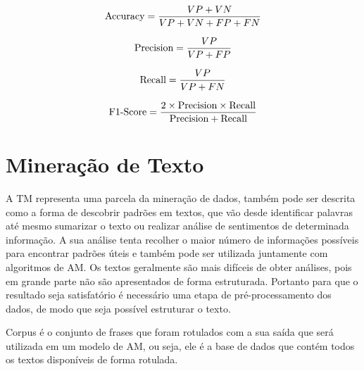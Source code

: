          \begin{equation}\label{acuracia}
            \begin{aligned}
              \textup{Accuracy} = \frac{VP+VN}{VP+VN+FP+FN}
          \end{aligned} 
          \end{equation}

          \begin{equation}\label{precision}
            \begin{aligned}
              \textup{Precision} = \frac{VP}{VP+FP}
          \end{aligned} 
          \end{equation}

          \begin{equation}\label{recall}
            \begin{aligned}
              \textup{Recall} = \frac{VP}{VP+FN}
          \end{aligned} 
          \end{equation}


          \begin{equation}\label{f1score}
            \begin{aligned}
              \textup{F$1$-Score} = \frac{2\times\textup{Precision}\times\textup{Recall}}{\textup{Precision}+\textup{Recall}}
          \end{aligned} 
          \end{equation}

\section{Mineração de Texto}

          A \acrshort{TM} representa uma parcela da mineração de dados, também pode ser descrita como a forma 
        de descobrir padrões em textos, que vão desde identificar palavras até mesmo sumarizar o texto ou realizar análise de sentimentos
        de determinada informação. A sua análise tenta recolher o maior número de informações possíveis para encontrar padrões úteis e também 
        pode ser utilizada juntamente com algoritmos de \acrshort{AM}. Os textos geralmente são mais difíceis de obter análises, pois em grande
        parte não são apresentados de forma estruturada. Portanto para que o resultado seja satisfatório é necessário uma etapa de pré-processamento
        dos dados, de modo que seja possível estruturar o texto.

            Corpus é o conjunto de frases que foram rotulados com a sua saída que será utilizada em um modelo de \acrshort{AM}, ou seja, ele é 
        a base de dados que contém todos os textos disponíveis de forma rotulada.

